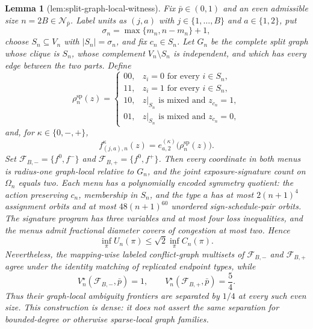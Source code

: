 \documentclass{article}
\newtheorem{lemma}{Lemma}
\begin{document}
\begin{lemma}[lem:split-graph-local-witness]\label{lem:split-graph-local-witness}
Fix \(\bar p\in(0,1)\) and an even admissible size \(n=2B\in\mathcal N_{\bar p}\). Label units as \((j,a)\) with \(j\in\{1,\ldots,B\}\) and \(a\in\{1,2\}\), put
\[
 \sigma_n=\max\{m_n,n-m_n\}+1,
\]
choose \(S_n\subseteq V_n\) with \(|S_n|=\sigma_n\), and fix \(c_n\in S_n\). Let \(G_n\) be the complete split graph whose clique is \(S_n\), whose complement \(V_n\setminus S_n\) is independent, and which has every edge between the two parts. Define
\[
 \rho_n^{\mathrm{sp}}(z)=
 \begin{cases}
 00,&z_i=0\text{ for every }i\in S_n,\\
 11,&z_i=1\text{ for every }i\in S_n,\\
 10,&z|_{S_n}\text{ is mixed and }z_{c_n}=1,\\
 01,&z|_{S_n}\text{ is mixed and }z_{c_n}=0,
 \end{cases} \tag{1}
\]
and, for \(\kappa\in\{0,-,+\}\),
\[
 f^\kappa_{(j,a),n}(z)
 =e^{(\kappa)}_{a,2}\bigl(\rho_n^{\mathrm{sp}}(z)\bigr). \tag{2}
\]
Set \(\mathcal F_{B,-}=\{f^0,f^-\}\) and \(\mathcal F_{B,+}=\{f^0,f^+\}\). Then every coordinate in both menus is radius-one graph-local relative to \(G_n\), and the joint exposure-signature count on \(\Omega_n\) equals two. Each menu has a polynomially encoded symmetry quotient: the action preserving \(c_n\), membership in \(S_n\), and the type \(a\) has at most \(2(n+1)^4\) assignment orbits and at most \(48(n+1)^{60}\) unordered sign-schedule-pair orbits. The signature program has three variables and at most four loss inequalities, and the menus admit fractional diameter covers of congestion at most two. Hence
\[
 \inf_\pi U_n(\pi)\le\sqrt2\inf_\pi C_n(\pi). \tag{3}
\]
Nevertheless, the mapping-wise labeled conflict-graph multisets of \(\mathcal F_{B,-}\) and \(\mathcal F_{B,+}\) agree under the identity matching of replicated endpoint types, while
\[
 V_n^\star(\mathcal F_{B,-},\bar p)=1,
 \qquad
 V_n^\star(\mathcal F_{B,+},\bar p)=\frac54. \tag{4}
\]
Thus their graph-local ambiguity frontiers are separated by \(1/4\) at every such even size. This construction is dense: it does not assert the same separation for bounded-degree or otherwise sparse-local graph families.
\end{lemma}
\end{document}
